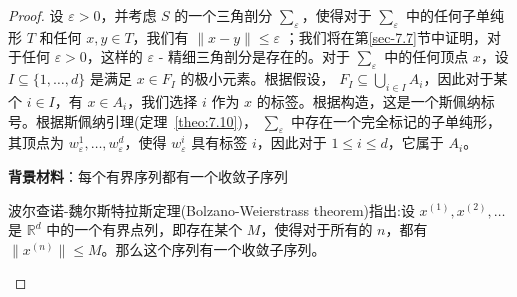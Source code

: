 \bigskip
\noindent
\begin{proof}
设 \(\varepsilon  > 0\)，并考虑 \(S\) 的一个三角剖分 \({\sum }_{\varepsilon }\)，使得对于 \({\sum }_{\varepsilon }\) 中的任何子单纯形 \(T\) 和任何 \(x,y \in  T\)，我们有 \(\parallel x - y\parallel  \leq  \varepsilon\) ；我们将在第\ref{sec-7.7}节中证明，对于任何 \(\varepsilon  > 0\)，这样的 \(\varepsilon\) - 精细三角剖分是存在的。对于 \({\sum }_{\varepsilon }\) 中的任何顶点 \(x\)，设 \(I \subseteq  \{ 1,\ldots,d\}\) {\color{red}是满足 \(x \in  {F}_{I}\) 的极小元素}。根据假设， \({F}_{I} \subseteq  \mathop{\bigcup }\limits_{{i \in  I}}{A}_{i}\)，因此对于某个 \(i \in  I\)，有 \(x \in  {A}_{i}\)，我们选择 \(i\) 作为 \(x\) 的标签。根据构造，这是一个斯佩纳标号。根据斯佩纳引理(定理~\ref{theo:7.10})， \({\sum }_{\varepsilon }\) 中存在一个完全标记的子单纯形，其顶点为 \({w}_{\varepsilon }^{1},\ldots,{w}_{\varepsilon }^{d}\)，使得 \({w}_{\varepsilon }^{i}\) 具有标签 \(i\)，因此对于 \(1 \leq  i \leq  d\)，它属于 \({A}_{i}\)。

\begin{mybox}{{\bf 背景材料}：每个有界序列都有一个收敛子序列}

波尔查诺-魏尔斯特拉斯定理(Bolzano-Weierstrass theorem)指出:设 \({x}^{\left( 1\right) },{x}^{\left( 2\right) },\ldots\) 是 \({\mathbb{R}}^{d}\) 中的一个有界点列，即存在某个 \(M\)，使得对于所有的 \(n\)，都有 \(\|{x}^{\left( n\right) }\|\leq  M\)。那么这个序列有一个收敛子序列。


\end{mybox}
\end{proof}
